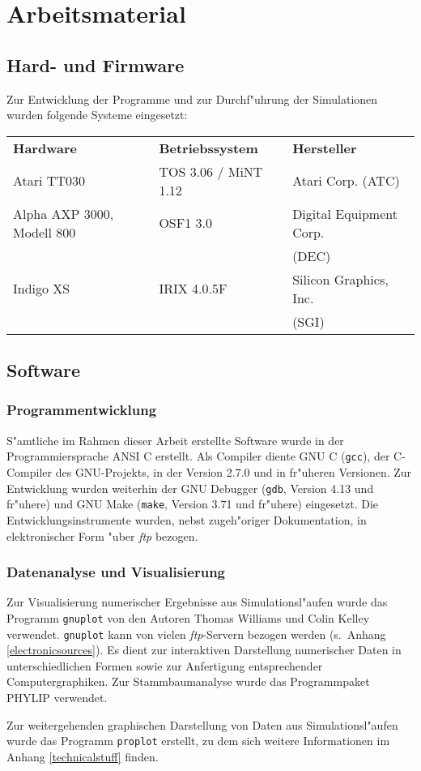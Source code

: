 \chapter{Arbeitsmaterial}

\section{Hard- und Firmware}
\label{material-hardware}

Zur Entwicklung der Programme und zur Durchf"uhrung der Simulationen wurden folgende Systeme eingesetzt:

\bigskip
\begin{tabular}{lll}
{\bfseries Hardware} & {\bfseries Betriebssystem} & {\bfseries Hersteller} \\
Atari TT030 & TOS 3.06 / MiNT 1.12 & Atari Corp.  (ATC) \\
Alpha AXP 3000, Modell 800 & OSF1 3.0 & Digital Equipment Corp. \\
			   &          & (DEC) \\
Indigo XS   & IRIX 4.0.5F & Silicon Graphics, Inc. \\
	    &             & (SGI) \\
\end{tabular}


\section{Software}
\label{material-software}

\subsection{Programmentwicklung}

S"amtliche im Rahmen dieser Arbeit erstellte Software wurde in der Programmiersprache
ANSI C \cite{Harbison91} erstellt. Als Compiler diente GNU C (\verb|gcc|), der C-Compiler des
GNU-Projekts, in der Version 2.7.0 und in fr"uheren Versionen. Zur Entwicklung wurden weiterhin
der GNU Debugger (\verb|gdb|, Version 4.13 und fr"uhere) und GNU Make (\verb|make|, Version 3.71
und fr"uhere) eingesetzt.
Die Entwicklungsinstrumente wurden, nebst zugeh"origer Dokumentation, in elektronischer Form "uber
{\slshape ftp} bezogen.


\subsection{Datenanalyse und Visualisierung}

Zur Visualisierung numerischer Ergebnisse aus Simulationsl"aufen wurde
das Programm \verb|gnuplot| von den Autoren Thomas Williams und Colin Kelley
verwendet. \verb|gnuplot| kann von vielen {\slshape ftp}-Servern
bezogen werden (s.\ Anhang \ref{electronicsources}). Es dient zur interaktiven Darstellung numerischer Daten
in unterschiedlichen Formen sowie zur Anfertigung entsprechender
Computergraphiken.
Zur Stammbaumanalyse wurde das Programmpaket PHYLIP \cite{PHYLIP} verwendet.

Zur weitergehenden graphischen Darstellung von Daten aus Simulationsl"aufen
wurde das Programm \verb|proplot| erstellt, zu dem sich weitere Informationen
im Anhang \ref{technicalstuff} finden.


